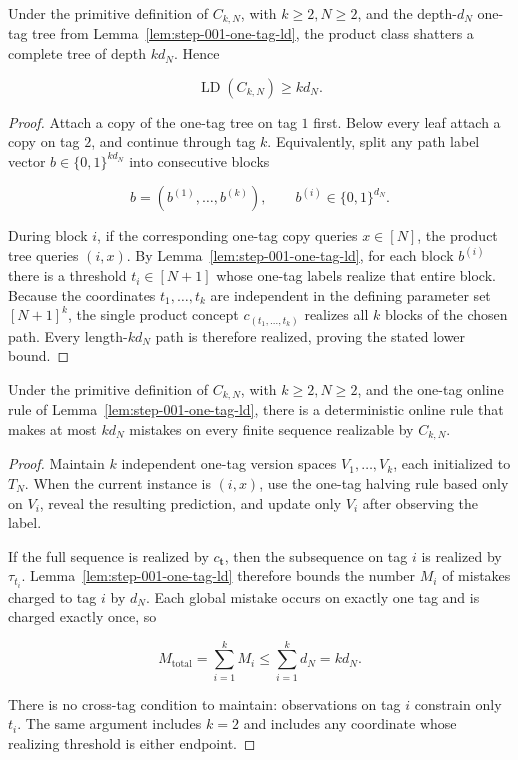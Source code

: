 \begin{lemma}\label{lem:step-001-product-lower}
Under the primitive definition of \(C_{k,N}\), with \(k\ge2,N\ge2\), and the depth-\(d_N\) one-tag tree from Lemma~\ref{lem:step-001-one-tag-ld}, the product class shatters a complete tree of depth \(kd_N\). Hence

\[
\operatorname{LD}(C_{k,N})\ge kd_N.
\]
\end{lemma}

\begin{proof}
Attach a copy of the one-tag tree on tag \(1\) first. Below every leaf attach a copy on tag \(2\), and continue through tag \(k\). Equivalently, split any path label vector \(b\in\{0,1\}^{kd_N}\) into consecutive blocks

\[
b=(b^{(1)},\ldots,b^{(k)}),\qquad b^{(i)}\in\{0,1\}^{d_N}.
\]

During block \(i\), if the corresponding one-tag copy queries \(x\in[N]\), the product tree queries \((i,x)\). By Lemma~\ref{lem:step-001-one-tag-ld}, for each block \(b^{(i)}\) there is a threshold \(t_i\in[N+1]\) whose one-tag labels realize that entire block. Because the coordinates \(t_1,\ldots,t_k\) are independent in the defining parameter set \([N+1]^k\), the single product concept \(c_{(t_1,\ldots,t_k)}\) realizes all \(k\) blocks of the chosen path. Every length-\(kd_N\) path is therefore realized, proving the stated lower bound. \end{proof}

\begin{lemma}\label{lem:step-001-product-budget}
Under the primitive definition of \(C_{k,N}\), with \(k\ge2,N\ge2\), and the one-tag online rule of Lemma~\ref{lem:step-001-one-tag-ld}, there is a deterministic online rule that makes at most \(kd_N\) mistakes on every finite sequence realizable by \(C_{k,N}\).
\end{lemma}

\begin{proof}
Maintain \(k\) independent one-tag version spaces \(V_1,\ldots,V_k\), each initialized to \(T_N\). When the current instance is \((i,x)\), use the one-tag halving rule based only on \(V_i\), reveal the resulting prediction, and update only \(V_i\) after observing the label.

If the full sequence is realized by \(c_{\boldsymbol t}\), then the subsequence on tag \(i\) is realized by \(\tau_{t_i}\). Lemma~\ref{lem:step-001-one-tag-ld} therefore bounds the number \(M_i\) of mistakes charged to tag \(i\) by \(d_N\). Each global mistake occurs on exactly one tag and is charged exactly once, so

\[
M_{\mathrm{total}}=\sum_{i=1}^k M_i
\le\sum_{i=1}^k d_N
=kd_N.
\]

There is no cross-tag condition to maintain: observations on tag \(i\) constrain only \(t_i\). The same argument includes \(k=2\) and includes any coordinate whose realizing threshold is either endpoint. \end{proof}

